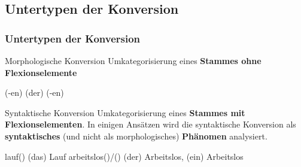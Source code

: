 \subsection{Untertypen der Konversion}

\begin{frame}
\frametitle{Untertypen der Konversion}


\begin{block}{Morphologische Konversion}
Umkategorisierung eines \textbf{Stammes ohne Flexionselemente}
\end{block}

\eal 
\ex {}(-en) \ras (der) 
\ex {} \ras {}(-en)
\zl

\pause 

\begin{block}{Syntaktische Konversion}
Umkategorisierung eines \textbf{Stammes mit Flexionselementen}. In einigen Ansätzen wird die syntaktische Konversion als \textbf{syntaktisches} (und nicht als morphologisches) \textbf{Phänomen} analysiert.
\end{block}

\eal 
\ex {}lauf() \ras  (das) Lauf 
\ex {}arbeitslos()/() \ras (der) Arbeitslos, (ein) Arbeitslos
\zl

\end{frame}


